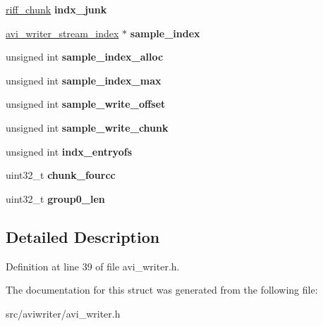 \begin{DoxyCompactItemize}
\item 
\hypertarget{structavi__writer__stream_adc1650f5039e6d87ef33f84d57739ce9}{\hyperlink{structriff__chunk}{riff\-\_\-chunk} {\bfseries indx\-\_\-junk}}\label{structavi__writer__stream_adc1650f5039e6d87ef33f84d57739ce9}

\item 
\hypertarget{structavi__writer__stream_a18738c93a85edc6497654199fc81997e}{\hyperlink{structavi__writer__stream__index}{avi\-\_\-writer\-\_\-stream\-\_\-index} $\ast$ {\bfseries sample\-\_\-index}}\label{structavi__writer__stream_a18738c93a85edc6497654199fc81997e}

\item 
\hypertarget{structavi__writer__stream_a5672a6f4945d3e0545dafaaf3ba1d3f7}{unsigned int {\bfseries sample\-\_\-index\-\_\-alloc}}\label{structavi__writer__stream_a5672a6f4945d3e0545dafaaf3ba1d3f7}

\item 
\hypertarget{structavi__writer__stream_a2f2db114c19282db775e8177c4fa673c}{unsigned int {\bfseries sample\-\_\-index\-\_\-max}}\label{structavi__writer__stream_a2f2db114c19282db775e8177c4fa673c}

\item 
\hypertarget{structavi__writer__stream_a37a1288dab4d9920d6c0962d67dfbdb8}{unsigned int {\bfseries sample\-\_\-write\-\_\-offset}}\label{structavi__writer__stream_a37a1288dab4d9920d6c0962d67dfbdb8}

\item 
\hypertarget{structavi__writer__stream_a0cafa8bf0bf8e256f9dd32987f6725f6}{unsigned int {\bfseries sample\-\_\-write\-\_\-chunk}}\label{structavi__writer__stream_a0cafa8bf0bf8e256f9dd32987f6725f6}

\item 
\hypertarget{structavi__writer__stream_af7a35387b24037cb6eccb73acb09e314}{unsigned int {\bfseries indx\-\_\-entryofs}}\label{structavi__writer__stream_af7a35387b24037cb6eccb73acb09e314}

\item 
\hypertarget{structavi__writer__stream_a64edeb191346191c6c068b5be816644c}{uint32\-\_\-t {\bfseries chunk\-\_\-fourcc}}\label{structavi__writer__stream_a64edeb191346191c6c068b5be816644c}

\item 
\hypertarget{structavi__writer__stream_aff1250ebfae2dfd37438753fe460b1ca}{uint32\-\_\-t {\bfseries group0\-\_\-len}}\label{structavi__writer__stream_aff1250ebfae2dfd37438753fe460b1ca}

\end{DoxyCompactItemize}


\subsection{Detailed Description}


Definition at line 39 of file avi\-\_\-writer.\-h.



The documentation for this struct was generated from the following file\-:\begin{DoxyCompactItemize}
\item 
src/aviwriter/avi\-\_\-writer.\-h\end{DoxyCompactItemize}
